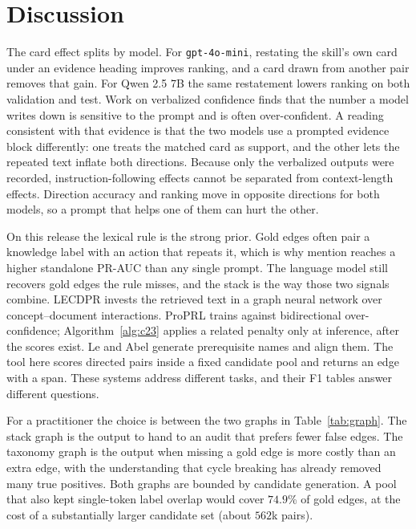 \documentclass{ws-ijait}
\begin{document}
\section{Discussion}
\label{sec:discussion}
The card effect splits by model.
For \texttt{gpt-4o-mini}, restating the skill's own card under an
evidence heading improves ranking, and a card drawn from another
pair removes that gain.
For {Qwen} 2.5 7B the same restatement lowers ranking on both
validation and test.
Work on verbalized confidence finds that the number a model writes
down is sensitive to the prompt and is often
over-confident\cite{Tian_2023,Xiong_2024}.
A reading consistent with that evidence is that the two models use
a prompted evidence block differently: one treats the matched card
as support, and the other lets the repeated text inflate both
directions.
Because only the verbalized outputs were recorded,
instruction-following effects cannot be separated from
context-length effects.
Direction accuracy and ranking move in opposite directions for both
models, so a prompt that helps one of them can hurt the other.

On this release the lexical rule is the strong prior.
Gold edges often pair a knowledge label with an action that repeats
it, which is why mention reaches a higher standalone {PR}-{AUC}
than any single prompt.
The language model still recovers gold edges the rule misses, and
the stack is the way those two signals combine.
{LECDPR}\cite{Xiao_2026} invests the retrieved text in a graph
neural network over concept--document interactions.
{ProPRL}\cite{Cheng_2026} trains against bidirectional
over-confidence; Algorithm~\ref{alg:c23} applies a related penalty
only at inference, after the scores exist.
Le and Abel\cite{Le_2025} generate prerequisite names and align
them.
The tool here scores directed pairs inside a fixed candidate pool
and returns an edge with a span.
These systems address different tasks, and their {F1} tables answer
different questions.

For a practitioner the choice is between the two graphs in
Table~\ref{tab:graph}.
The stack graph is the output to hand to an audit that prefers
fewer false edges.
The taxonomy graph is the output when missing a gold edge is more
costly than an extra edge, with the understanding that cycle
breaking has already removed many true positives.
Both graphs are bounded by candidate generation.
A pool that also kept single-token label overlap would cover
$74.9$\% of gold edges, at the cost of a substantially larger
candidate set (about $562$k pairs).
\end{document}

